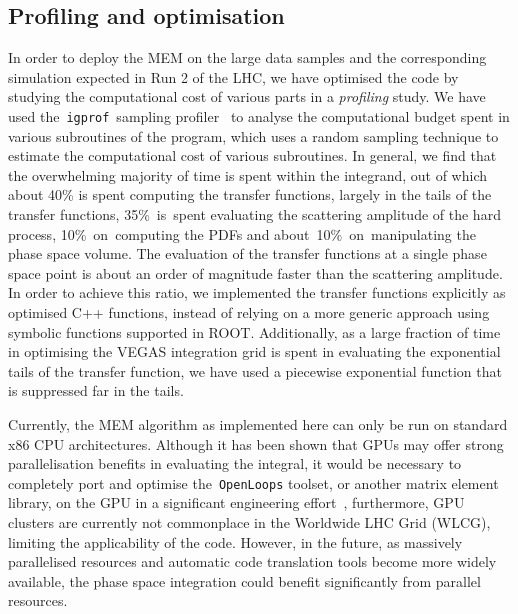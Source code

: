 \subsection{Profiling and optimisation}
\label{sec:mem_optimisation}

In order to deploy the MEM on the large data samples and the corresponding simulation expected in Run 2 of the LHC, we have optimised the code by studying the computational cost of various parts in a \textit{profiling} study. We have used the~\texttt{igprof}~sampling profiler~\cite{Eulisse:2005zz,Tuura:2008zza} to analyse the computational budget spent in various subroutines of the program, which uses a random sampling technique to estimate the computational cost of various subroutines. In general, we find    
that the overwhelming majority of time is spent within the integrand, out of which about 40\% is spent computing the transfer functions, largely in the tails of the transfer functions, 35\%~is~spent evaluating the scattering amplitude of the hard process, 10\%~on~computing the PDFs and about~10\%~on~manipulating the phase space volume. The evaluation of the transfer functions at a single phase space point is about an order of magnitude faster than the scattering amplitude. In order to achieve this ratio, we implemented the transfer functions explicitly as optimised C++ functions, instead of relying on a more generic approach using symbolic functions supported in ROOT. Additionally, as a large fraction of time in optimising the VEGAS integration grid is spent in evaluating the exponential tails of the transfer function, we have used a piecewise exponential function that is suppressed far in the tails.

Currently, the MEM algorithm as implemented here can only be run on standard x86 CPU architectures. Although it has been shown that GPUs may offer strong parallelisation benefits in evaluating the integral, it would be necessary to completely port and optimise the~\texttt{OpenLoops} toolset, or another matrix element library, on the GPU in a significant engineering effort~\cite{Schouten:2014yza}, furthermore, GPU clusters are currently not commonplace in the Worldwide LHC Grid (WLCG), limiting the applicability of the code. However, in the future, as massively parallelised resources and automatic code translation tools become more widely available, the phase space integration could benefit significantly from parallel resources.

